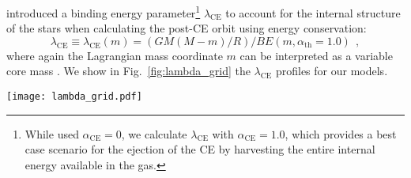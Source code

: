 \documentclass[twocolumn,twocolappendix,trackchanges]{aastex63}
\DeclareRobustCommand{\Figref}[1]{Fig.~\ref{#1}}
\newcommand{\todo}[1]{{\large $\blacksquare$~\textbf{\color{red}[#1]}}~$\blacksquare$}
\begin{document}
\cite{dekool:1990} introduced a binding energy
parameter\footnote{While \cite{dekool:1990} used
  $\alpha_\mathrm{CE}=0$, we calculate $\lambda_\mathrm{CE}$ with
  $\alpha_\mathrm{CE}=1.0$, which provides a best case scenario for
  the ejection of the CE by harvesting the entire internal energy
  available in the gas.}
$\lambda_\mathrm{CE}$ to account for the internal structure of the
stars when calculating the post-CE orbit using energy conservation:
\begin{equation}
  \label{eq:lambda}
  \lambda_\mathrm{CE} \equiv \lambda_\mathrm{CE}(m) = (GM(M-m)/R)/BE(m, \alpha_\mathrm{th}=1.0) \ \ ,
\end{equation}
where again the Lagrangian mass coordinate $m$ can be interpreted as a
variable core mass \citep[see also][]{demarco:11, ivanova:2013}. We show
in \Figref{fig:lambda_grid} the $\lambda_\mathrm{CE}$ profiles for our models.

\begin{figure*}[htbp]
  \centering
  \texttt{[image: lambda\_grid.pdf]}
  \caption{Profile of the binding energy parameter
    $\lambda_\mathrm{CE}$ as a function of mass coordinate for
    accretors (orange), single stars (red), and our engineered stars
    (other colors) at selected total radii. The vertical dashed lines
    mark $M_\mathrm{He}$, that is the outermost location where
    $X<0.01$ and $Y>0.1$.\todo{fix}}
  \label{fig:lambda_grid}
\end{figure*}



\end{document}
